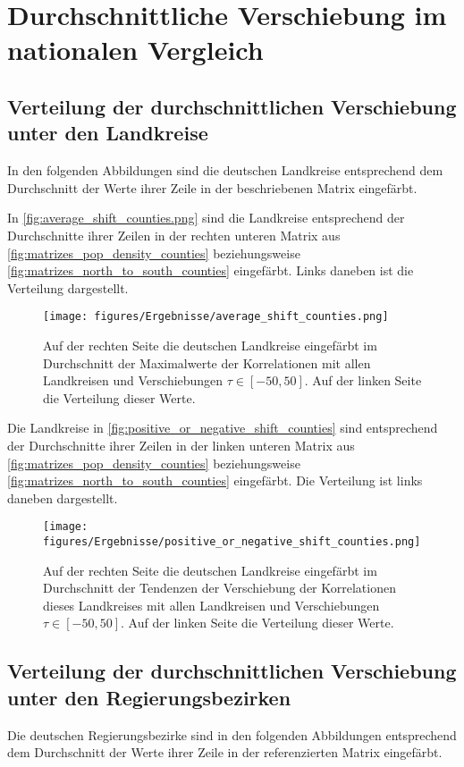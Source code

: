 \section{Durchschnittliche Verschiebung im nationalen Vergleich}
\subsection{Verteilung der durchschnittlichen Verschiebung unter den Landkreise}
In den folgenden Abbildungen sind die deutschen Landkreise entsprechend dem Durchschnitt der Werte ihrer Zeile in der beschriebenen Matrix eingefärbt.


In \autoref{fig:average_shift_counties.png} sind die Landkreise entsprechend der Durchschnitte ihrer Zeilen in der rechten unteren Matrix aus \autoref{fig:matrizes_pop_density_counties} beziehungsweise \autoref{fig:matrizes_north_to_south_counties} eingefärbt. Links daneben ist die Verteilung dargestellt.

\begin{figure}[H]
    \centering
    \texttt{[image: figures/Ergebnisse/average\_shift\_counties.png]}
    \caption{Auf der rechten Seite die deutschen Landkreise eingefärbt im Durchschnitt der Maximalwerte der Korrelationen mit allen Landkreisen und Verschiebungen $\tau\in[-50,50]$. Auf der linken Seite die Verteilung dieser Werte.}
    \label{fig:average_shift_counties.png}
\end{figure}

Die Landkreise in \autoref{fig:positive_or_negative_shift_counties} sind  entsprechend der Durchschnitte ihrer Zeilen in der linken unteren Matrix aus \autoref{fig:matrizes_pop_density_counties} beziehungsweise \autoref{fig:matrizes_north_to_south_counties} eingefärbt. Die Verteilung ist links daneben dargestellt.

\begin{figure}[H]
    \centering
    \texttt{[image: figures/Ergebnisse/positive\_or\_negative\_shift\_counties.png]}
    \caption{Auf der rechten Seite die deutschen Landkreise eingefärbt im Durchschnitt der Tendenzen der Verschiebung der Korrelationen dieses Landkreises mit allen Landkreisen und Verschiebungen $\tau\in[-50,50]$. Auf der linken Seite die Verteilung dieser Werte.}
    \label{fig:positive_or_negative_shift_counties}
\end{figure}



\subsection{Verteilung der durchschnittlichen Verschiebung unter den Regierungsbezirken}
Die deutschen Regierungsbezirke sind in den folgenden Abbildungen entsprechend dem Durchschnitt der Werte ihrer Zeile in der referenzierten Matrix eingefärbt.

